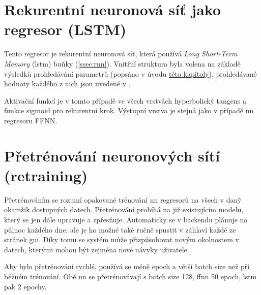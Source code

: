     \section{Rekurentní neuronová síť jako regresor (LSTM)} \label{sec:lstm}
        Tento regresor je rekurentní neuronová síť, která používá \emph{Long Short-Term Memory} (\acrshort{lstm}) buňky (\cref{ssec:rnn}). Vnitřní struktura byla volena na základě výsledků prohledávání parametrů (popsáno v úvodu \hyperref[chap:regresory]{této kapitoly}), prohledávané hodnoty každého z nich jsou uvedené v .
        
        Aktivační funkcí je v tomto případě ve všech vrstvách hyperbolický tangens a funkce sigmoid pro rekurentní krok. Výstupní vrstva je stejná jako v případě \acrshort{nn} regresoru FFNN.
    \section{Přetrénování neuronových sítí (retraining)} \label{sec:retraining}
        Přetrénováním se rozumí opakované trénování \acrshort{nn} regresorů na všech v daný okamžik dostupných datech. Přetrénování probíhá na již existujícím modelu, který se jen dále upravuje a zpřesňuje. Automaticky se v backendu plánuje na půlnoc každého dne, ale je ho možné také ručně spustit v záhlaví každé ze stránek \acrshort{gui}. Díky tomu se systém může přizpůsobovat novým okolnostem v datech, kterými mohou být zejména nové návyky uživatele.

        Aby bylo přetrénování rychlé, používá se méně epoch a větší batch size než při běžném trénování. Obě \acrshort{nn} se přetrénovávají s batch size 128, \acrshort{ffnn} 50 epoch, \acrshort{lstm} pak 2 epochy.